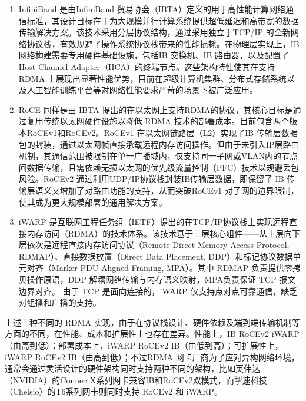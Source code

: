 {    \begin{enumerate}[label=\arabic*.]
        \item InfiniBand 是由InfiniBand 贸易协会（IBTA）定义的用于高性能计算网络通信标准，其设计目标在于为大规模并行计算系统提供超低延迟和高带宽的数据传输解决方案。该技术采用分层协议结构，通过采用独立于TCP/IP 的全新网络协议栈，有效规避了操作系统协议栈带来的性能损耗。在物理层实现上，IB 网络构建需要专用硬件基础设施，包括IB 交换机、IB 路由器，以及配置了Host Channel Adapter（HCA）的终端节点。这些架构特性使其在支持 RDMA 上展现出显著性能优势，目前在超级计算机集群、分布式存储系统以及人工智能训练平台等对网络性能要求严苛的场景下被广泛应用。
        \item RoCE 同样是由 IBTA 提出的在以太网上支持RDMA的协议，其核心目标是通过复用传统以太网硬件设施以降低 RDMA 技术的部署成本。目前包含两个版本RoCEv1和RoCEv2。RoCEv1 在以太网链路层（L2）实现了IB 传输层数据包的封装，通过以太网帧直接承载远程内存访问操作。但由于未引入IP层路由机制，其通信范围被限制在单一广播域内，仅支持同一子网或VLAN内的节点间数据传输，且需依赖无损以太网的优先级流量控制（PFC）技术以规避丢包风险。RoCEv2 通过利用UDP/IP协议栈封装IB传输层数据，即保留了 IB 传输层语义又增加了对路由功能的支持，从而突破RoCEv1 对子网的边界限制，使其成为更大规模部署的通用解决方案。
        \item iWARP 是互联网工程任务组（IETF）提出的在TCP/IP协议栈上实现远程直接内存访问（RDMA）的技术体系。该技术基于三层核心组件——从上层向下层依次是远程直接内存访问协议（Remote Direct Memory Access Protocol, RDMAP）、直接数据放置（Direct Data Placement, DDP）和标记协议数据单元对齐（Marker PDU Aligned Framing, MPA）。其中 RDMAP 负责提供零拷贝操作原语，DDP 解耦网络传输与内存语义映射，MPA负责保证 TCP 报文边界对齐。 由于 TCP 是面向连接的，iWARP 仅支持点对点可靠通信，缺乏对组播和广播的支持。
    \end{enumerate}

    上述三种不同的 RDMA 实现，由于在协议栈设计、硬件依赖及端到端传输机制等方面的不同，在性能、成本和扩展性上也存在差异。性能上，IB \text{>} RoCEv2 \text{>} iWARP（由高到低）；部署成本上，iWARP \text{>} RoCEv2 \text{>} IB（由低到高）；可扩展性上，iWARP \text{>} RoCEv2 \text{>} IB（由高到低）；不过RDMA 网卡厂商为了应对异构网络环境，通常会通过灵活设计的硬件架构同时支持两种不同的架构，比如英伟达（NVIDIA）的ConnectX系列网卡兼容IB和RoCEv2双模式，而掣速科技（Chelsio）的T6系列网卡则同时支持 RoCEv2 和 iWARP。

}
